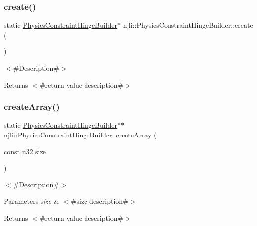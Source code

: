 \subsubsection{\texorpdfstring{create()}{create()}}
{\footnotesize\ttfamily static \mbox{\hyperlink{classnjli_1_1_physics_constraint_hinge_builder}{Physics\+Constraint\+Hinge\+Builder}}$\ast$ njli\+::\+Physics\+Constraint\+Hinge\+Builder\+::create (\begin{DoxyParamCaption}{ }\end{DoxyParamCaption})\hspace{0.3cm}{\ttfamily [static]}}

$<$\#\+Description\#$>$

\begin{DoxyReturn}{Returns}
$<$\#return value description\#$>$ 
\end{DoxyReturn}
\mbox{\label{classnjli_1_1_physics_constraint_hinge_builder_a25525a2de723ed80a5db00bc013a7d83}} 
\subsubsection{\texorpdfstring{create\+Array()}{createArray()}}
{\footnotesize\ttfamily static \mbox{\hyperlink{classnjli_1_1_physics_constraint_hinge_builder}{Physics\+Constraint\+Hinge\+Builder}}$\ast$$\ast$ njli\+::\+Physics\+Constraint\+Hinge\+Builder\+::create\+Array (\begin{DoxyParamCaption}\item[{const \mbox{\hyperlink{_util_8h_a10e94b422ef0c20dcdec20d31a1f5049}{u32}}}]{size }\end{DoxyParamCaption})\hspace{0.3cm}{\ttfamily [static]}}

$<$\#\+Description\#$>$


\begin{DoxyParams}{Parameters}
{\em size} & $<$\#size description\#$>$\\
\hline
\end{DoxyParams}
\begin{DoxyReturn}{Returns}
$<$\#return value description\#$>$ 
\end{DoxyReturn}
\mbox{\label{classnjli_1_1_physics_constraint_hinge_builder_a62a14c8bca5cd2075bf6a579f612baa0}} 
